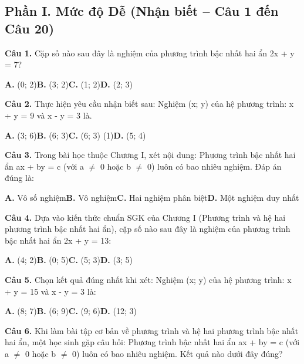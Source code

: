\documentclass[11pt,a4paper]{article}
\begin{document}
\subsection*{\color{accent} Phần I. Mức độ Dễ (Nhận biết -- Câu 1 đến Câu 20)}
\textbf{\color{primary} Câu 1.} Cặp số nào sau đây là nghiệm của phương trình bậc nhất hai ẩn 2x + y = 7?\par
\hspace*{1.5em}\textbf{A.} (0; 2)\quad\quad \textbf{B.} (3; 2)\quad\quad \textbf{C.} (1; 2)\quad\quad \textbf{D.} (2; 3)\par\vspace{2pt}
\textbf{\color{primary} Câu 2.} Thực hiện yêu cầu nhận biết sau: Nghiệm (x; y) của hệ phương trình: x + y = 9 và x - y = 3 là.\par
\hspace*{1.5em}\textbf{A.} (3; 6)\quad\quad \textbf{B.} (6; 3)\quad\quad \textbf{C.} (6; 3) (1)\quad\quad \textbf{D.} (5; 4)\par\vspace{2pt}
\textbf{\color{primary} Câu 3.} Trong bài học thuộc Chương I, xét nội dung: Phương trình bậc nhất hai ẩn ax + by = c (với a $\ne$ 0 hoặc b $\ne$ 0) luôn có bao nhiêu nghiệm. Đáp án đúng là:\par
\hspace*{1.5em}\textbf{A.} Vô số nghiệm\quad\quad \textbf{B.} Vô nghiệm\quad\quad \textbf{C.} Hai nghiệm phân biệt\quad\quad \textbf{D.} Một nghiệm duy nhất\par\vspace{2pt}
\textbf{\color{primary} Câu 4.} Dựa vào kiến thức chuẩn SGK của Chương I (Phương trình và hệ hai phương trình bậc nhất hai ẩn), cặp số nào sau đây là nghiệm của phương trình bậc nhất hai ẩn 2x + y = 13:\par
\hspace*{1.5em}\textbf{A.} (4; 2)\quad\quad \textbf{B.} (0; 5)\quad\quad \textbf{C.} (5; 3)\quad\quad \textbf{D.} (3; 5)\par\vspace{2pt}
\textbf{\color{primary} Câu 5.} Chọn kết quả đúng nhất khi xét: Nghiệm (x; y) của hệ phương trình: x + y = 15 và x - y = 3 là:\par
\hspace*{1.5em}\textbf{A.} (8; 7)\quad\quad \textbf{B.} (6; 9)\quad\quad \textbf{C.} (9; 6)\quad\quad \textbf{D.} (12; 3)\par\vspace{2pt}
\textbf{\color{primary} Câu 6.} Khi làm bài tập cơ bản về phương trình và hệ hai phương trình bậc nhất hai ẩn, một học sinh gặp câu hỏi: Phương trình bậc nhất hai ẩn ax + by = c (với a $\ne$ 0 hoặc b $\ne$ 0) luôn có bao nhiêu nghiệm. Kết quả nào dưới đây đúng?\par
\end{document}

